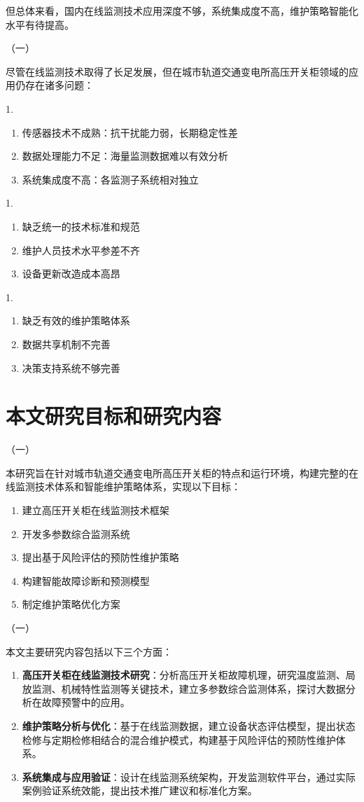 但总体来看，国内在线监测技术应用深度不够，系统集成度不高，维护策略智能化水平有待提高。

（一）

尽管在线监测技术取得了长足发展，但在城市轨道交通变电所高压开关柜领域的应用仍存在诸多问题：

1.
\begin{enumerate}
    \item 传感器技术不成熟：抗干扰能力弱，长期稳定性差
    \item 数据处理能力不足：海量监测数据难以有效分析
    \item 系统集成度不高：各监测子系统相对独立
\end{enumerate}

1.
\begin{enumerate}
    \item 缺乏统一的技术标准和规范
    \item 维护人员技术水平参差不齐
    \item 设备更新改造成本高昂
\end{enumerate}

1.
\begin{enumerate}
    \item 缺乏有效的维护策略体系
    \item 数据共享机制不完善
    \item 决策支持系统不够完善
\end{enumerate}

\section{本文研究目标和研究内容}

（一）

本研究旨在针对城市轨道交通变电所高压开关柜的特点和运行环境，构建完整的在线监测技术体系和智能维护策略体系，实现以下目标：
\begin{enumerate}
    \item 建立高压开关柜在线监测技术框架
    \item 开发多参数综合监测系统
    \item 提出基于风险评估的预防性维护策略
    \item 构建智能故障诊断和预测模型
    \item 制定维护策略优化方案
\end{enumerate}

（一）

本文主要研究内容包括以下三个方面：

\begin{enumerate}
    \item \textbf{高压开关柜在线监测技术研究}：分析高压开关柜故障机理，研究温度监测、局放监测、机械特性监测等关键技术，建立多参数综合监测体系，探讨大数据分析在故障预警中的应用。

    \item \textbf{维护策略分析与优化}：基于在线监测数据，建立设备状态评估模型，提出状态检修与定期检修相结合的混合维护模式，构建基于风险评估的预防性维护体系。

    \item \textbf{系统集成与应用验证}：设计在线监测系统架构，开发监测软件平台，通过实际案例验证系统效能，提出技术推广建议和标准化方案。
\end{enumerate}